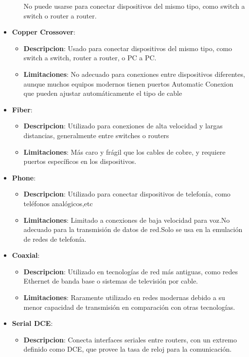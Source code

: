 \documentclass{article}
\begin{document}
\begin{itemize}
\begin{itemize}
                    No puede usarse para conectar dispositivos del mismo tipo, como switch a switch o router a router.
                \end{itemize} 
            \item\textbf{Copper Crossover}: 
                \begin{itemize}
                    \item\textbf{Descripcion}:
                    Usado para conectar dispositivos del mismo tipo, como switch a switch, router a router, o PC a PC.
                    \item\textbf{Limitaciones}:
                    No adecuado para conexiones entre dispositivos diferentes, aunque muchos equipos modernos tienen puertos Automatic Conexion que pueden ajustar automáticamente el tipo de cable
                \end{itemize} 
            \item\textbf{Fiber}: 
                \begin{itemize}
                    \item\textbf{Descripcion}:
                    Utilizado para conexiones de alta velocidad y largas distancias, generalmente entre switches o routers 
                    \item\textbf{Limitaciones}:
                    Más caro y frágil que los cables de cobre, y requiere puertos específicos en los dispositivos.
                \end{itemize} 
            \item\textbf{Phone}: 
                \begin{itemize}
                    \item\textbf{Descripcion}:
                    Utilizado para conectar dispositivos de telefonía, como teléfonos analógicos,etc
                    \item\textbf{Limitaciones}:
                    Limitado a conexiones de baja velocidad para voz.No adecuado para la transmisión de datos de red.Solo se usa en la emulación de redes de telefonía.
                \end{itemize} 
            \item\textbf{Coaxial}:
                \begin{itemize}
                    \item\textbf{Descripcion}:
                    Utilizado en tecnologías de red más antiguas, como redes Ethernet de banda base o sistemas de televisión por cable.
                    \item\textbf{Limitaciones}:
                    Raramente utilizado en redes modernas debido a su menor capacidad de transmisión en comparación con otras tecnologías.
                \end{itemize} 
            \item\textbf{Serial DCE}: 
                \begin{itemize}
                    \item\textbf{Descripcion}:
                    Conecta interfaces seriales entre routers, con un extremo definido como DCE, que provee la tasa de reloj para la comunicación.


\end{itemize}
\end{itemize}
\end{document}
